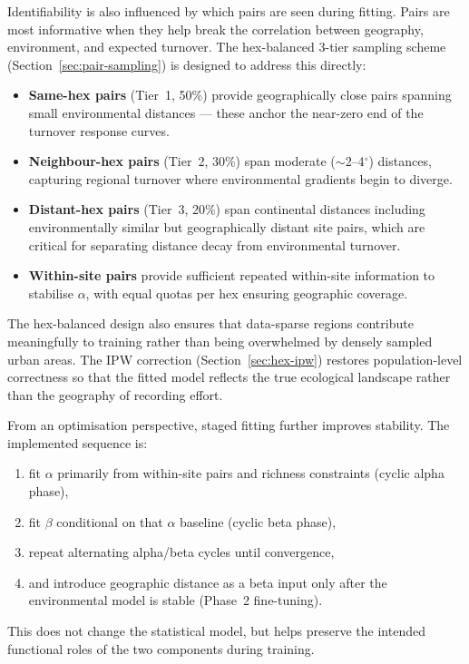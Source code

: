 \documentclass{article}
\begin{document}
Identifiability is also influenced by which pairs are seen during fitting. Pairs are most informative when they help break the correlation between geography, environment, and expected turnover. The hex-balanced 3-tier sampling scheme (Section~\ref{sec:pair-sampling}) is designed to address this directly:
\begin{itemize}
    \item \textbf{Same-hex pairs} (Tier~1, 50\%) provide geographically close pairs spanning small environmental distances --- these anchor the near-zero end of the turnover response curves.
    \item \textbf{Neighbour-hex pairs} (Tier~2, 30\%) span moderate ($\sim$2--4$^\circ$) distances, capturing regional turnover where environmental gradients begin to diverge.
    \item \textbf{Distant-hex pairs} (Tier~3, 20\%) span continental distances including environmentally similar but geographically distant site pairs, which are critical for separating distance decay from environmental turnover.
    \item \textbf{Within-site pairs} provide sufficient repeated within-site information to stabilise $\alpha$, with equal quotas per hex ensuring geographic coverage.
\end{itemize}

The hex-balanced design also ensures that data-sparse regions contribute meaningfully to training rather than being overwhelmed by densely sampled urban areas. The IPW correction (Section~\ref{sec:hex-ipw}) restores population-level correctness so that the fitted model reflects the true ecological landscape rather than the geography of recording effort.

From an optimisation perspective, staged fitting further improves stability. The implemented sequence is:
\begin{enumerate}
    \item fit $\alpha$ primarily from within-site pairs and richness constraints (cyclic alpha phase),
    \item fit $\beta$ conditional on that $\alpha$ baseline (cyclic beta phase),
    \item repeat alternating alpha/beta cycles until convergence,
    \item and introduce geographic distance as a beta input only after the environmental model is stable (Phase~2 fine-tuning).
\end{enumerate}
This does not change the statistical model, but helps preserve the intended functional roles of the two components during training.
\end{document}
